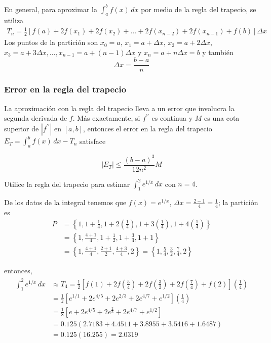 En general, para aproximar la $\int_{a}^{b}f(x)\,dx$ por medio de la regla del trapecio, se utiliza
\begin{gather*}
  T_{n}=\frac{1}{2}\left[ f(a)+2f(x_{1})+2f(x_{2})+\ldots+2f(x_{n-2})+2f(x_{n-1})+f(b)\right] \Delta x
\end{gather*}
Los puntos de la partición son $x_{0}=a$, $x_{1}=a+\Delta x$, $x_{2}=a+2\Delta x$, $x_{3}=a+3\Delta x,\ldots,x_{n-1}=a+(n-1)\Delta x$\; y\; $x_{n}=a+n\Delta x=b$\; y también
\[
  \Delta x=\frac{b-a}{n}
\]

\subsubsection{Error en la regla del trapecio}

La aproximación con la regla del trapecio lleva a un error que involucra la segunda derivada de $f$. Más exactamente, si $f^{\prime\prime}$ es continua y $M$ es una cota superior de $\left\vert
f^{\prime\prime}\right\vert $ en $\left[ a,b\right] $, entonces el error en la regla del trapecio $E_{T}=\int_{a}^{b}f(x)\,dx-T_{n}$ satisface

\[
  \left\vert E_{T}\right\vert \leq \frac{\left( b-a\right) ^{3}}{12n^{2}}M
\]

\begin{ejemplo}
  Utilice la regla del trapecio para estimar $\int_{1}^{2}e^{1/x}\,dx$ con $n=4$.
\end{ejemplo}

De los datos de la integral tenemos que $f(x)=e^{1/x}$, $\Delta x=\frac{2-1}{4}=\frac{1}{4}$; la partición es
\begin{align*}
  P&=\left\{1,1+\frac{1}{4},1+2\left(\frac{1}{4}\right),1+3\left(\frac{1}{4}\right),1+4\left(\frac{1}{4}\right)\right\}\\
  &=\left\{1,\frac{4+1}{4},1+\frac{1}{2},1+\frac{3}{4},1+1\right\}\\
  &=\left\{1,\frac{4+1}{4},\frac{2+1}{2},\frac{4+3}{4},2\right\}
  =\left\{1,\frac{5}{4},\frac{3}{2},\frac{7}{4},2\right\}
\end{align*}

entonces,
\begin{gather*}
  \begin{aligned}
    \int_{1}^{2}e^{1/x}\,dx&\approx T_4=\frac{1}{2}\left[ f(1)+2f\left(\frac{5}{4}\right)+2f\left(\frac{3}{2}\right)+2f\left(\frac{7}{4}\right)+f(2)\right] \left( \frac{1}{4}\right)\\
    &=\frac{1}{2}\left[ e^{1/1}+2e^{4/5}+2e^{2/3}+2e^{4/7}+e^{1/2}\right] \left( \frac{1}{4}\right)\\
    &=\frac{1}{8}\left[ e+2e^{4/5}+2e^{\frac{2}{3}}+2e^{4/7}+e^{1/2}\right]\\
    &=0.125(2.7183+4.4511+3.8955+3.5416+1.6487)\\
    &=0.125(16.255)=2.0319
  \end{aligned}
\end{gather*}

